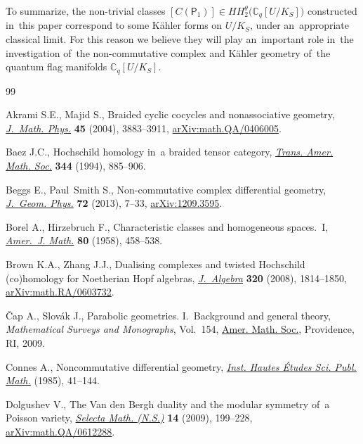 \documentclass[pdftex]{sigma}
\numberwithin{equation}{section}
\newcommand{\Cqflag}{\mathbb{C}_q[U / K_S]}
\newcommand{\proj}{\mathsf{P}}
\begin{document}
To summarize, the non-trivial classes $[C(\proj_1)] \in HH^\theta_2\big(\Cqflag\big)$ constructed in~this paper correspond to some K\"ahler forms on $U / K_S$, under an~appropriate classical limit.
For this reason we believe they will play an~important role in~the investigation of~the non-commutative complex and K\"ahler geometry of~the quantum flag manifolds $\Cqflag$.

\begin{thebibliography}{99}
\footnotesize\itemsep=0pt

Akrami S.E., Majid S., Braided cyclic cocycles and nonassociative geometry,
 \href{https://doi.org/10.1063/1.1787621}{\textit{J.~Math. Phys.}} \textbf{45} (2004), 3883--3911,
 \href{https://arxiv.org/abs/math.QA/0406005}{arXiv:math.QA/0406005}.

Baez J.C., Hoch\-schild homology in~a braided tensor category, \href{https://doi.org/10.2307/2154514}{\textit{Trans.
 Amer. Math. Soc.}} \textbf{344} (1994), 885--906.

Beggs E., Paul~Smith S., Non-commutative complex differential geometry,
 \href{https://doi.org/10.1016/j.geomphys.2013.03.018}{\textit{J.~Geom. Phys.}} \textbf{72} (2013), 7--33, \href{https://arxiv.org/abs/1209.3595}{arXiv:1209.3595}.

Borel A., Hirzebruch F., Characteristic classes and homogeneous spaces.~{I},
 \href{https://doi.org/10.2307/2372795}{\textit{Amer.~J. Math.}} \textbf{80} (1958), 458--538.

Brown K.A., Zhang J.J., Dualising complexes and twisted {H}ochschild
 (co)homology for {N}oetherian {H}opf algebras, \href{https://doi.org/10.1016/j.jalgebra.2007.03.050}{\textit{J.~Algebra}}
 \textbf{320} (2008), 1814--1850, \href{https://arxiv.org/abs/math.RA/0603732}{arXiv:math.RA/0603732}.


\v{C}ap A., Slov\'ak J., Parabolic geometries. {I}.~Background and general
 theory, \textit{Mathematical Surveys and Monographs}, Vol.~154, \href{https://doi.org/10.1090/surv/154}{Amer. Math.
 Soc.}, Providence, RI, 2009.

Connes A., Noncommutative differential geometry, \href{https:////doi.org/10.1007/BF02698807}{\textit{Inst. Hautes
 \'Etudes Sci. Publ. Math.}} (1985), 41--144.

Dolgushev V., The {V}an den {B}ergh duality and the modular symmetry of~a
 {P}oisson variety, \href{https://doi.org/10.1007/s00029-008-0062-z}{\textit{Selecta Math. (N.S.)}} \textbf{14} (2009),
 199--228, \href{https://arxiv.org/abs/math.QA/0612288}{arXiv:math.QA/0612288}.


\end{thebibliography}
\end{document}

